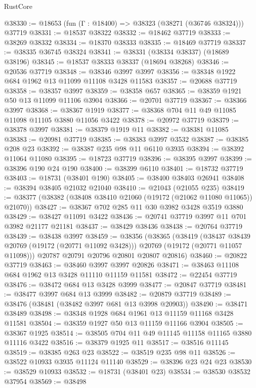 \begin{lexlean}{RustCore}
\begin{coremodule}
@38330 := @18653 (fun (Γ : @18400) => @38323 (@38271 (@36746 @38324))) @37719
@38331 := @18537 @38322
@38332 := @18462 @37719
@38333 := @38269 @38332
@38334 := @18370 @38333
@38335 := @18469 @37719
@38337 := @38335 @36745 @38324
@38341 := @38331 (@38334 @38337) (@18689 @38196)
@38345 := @18537 @38333 @38337 (@18694 @38268)
@38346 := @20536 @37719
@38348 := @38346 @3997 @3997
@38356 := @38348 @1922 @684 @1962 @13 @11099 @11108 @3428 @11583
@38357 := @20688 @37719
@38358 := @38357 @3997
@38359 := @38358 @657
@38365 := @38359 @1921 @50 @13 @11099 @11106 @3904
@38366 := @20701 @37719
@38367 := @38366 @3997
@38368 := @38367 @1919
@38377 := @38368 @704 @11 @49 @11085 @11098 @11105 @3880 @11056 @3422
@38378 := @20972 @37719
@38379 := @38378 @3997
@38381 := @38379 @1919 @11
@38382 := @38381 @11085
@38383 := @20981 @37719
@38385 := @38383 @3997 @3532
@38387 := @38385 @208 @23
@38392 := @38387 @235 @98 @11 @6110 @3935
@38394 := @38392 @11064 @11080
@38395 := @18723 @37719
@38396 := @38395 @3997
@38399 := @38396 @190 @24 @190
@38400 := @38399 @6110
@38401 := @18732 @37719
@38403 := @18731 (@38401 @190)
@38405 := @38400 @38403 @26941
@38408 := @38394 @38405 @21032 @21040
@38410 := @21043 (@21055 @235)
@38419 := @38377 (@38382 (@38408 @38410 @21060 (@19172 (@21062 @11080 @11065)) @21070))
@38427 := @38367 @702 @285 @11 @30 @3982 @3428 @3519 @3880
@38429 := @38427 @11091 @3422
@38436 := @20741 @37719 @3997 @11 @701 @3982 @21177 @21181
@38437 := @38429 @38436
@38438 := @20764 @37719
@38439 := @38438 @3997
@38459 := @38356
    (@38365
      (@38419
        (@38437 @38439 @20769 (@19172 (@20771 @11092 @3428)))
        @20769
        (@19172 (@20771 @11057 @11098)))
      @20787
      @20791
      @20796
      @20801
      @20807
      @20816)
@38460 := @20822 @37719
@38463 := @38460 @3997 @3997 @20826
@38471 := @38463 @11108 @684 @1962 @13 @3428 @11110 @11159 @11581
@38472 := @22454 @37719
@38476 := @38472 @684 @13 @3428 @3999
@38477 := @20847 @37719
@38481 := @38477 @3997 @684 @13 @3999
@38482 := @20879 @37719
@38489 := @38476 (@38481 (@38482 @3997 @681 @13 @3998 @20903))
@38490 := @38471 @38489
@38498 := @38348 @1928 @684 @1961 @13 @11159 @11168 @3428 @11581
@38504 := @38359 @1927 @50 @13 @11159 @11166 @3904
@38505 := @38367 @1925
@38514 := @38505 @704 @11 @49 @11145 @11158 @11165 @3880 @11116 @3422
@38516 := @38379 @1925 @11
@38517 := @38516 @11145
@38519 := @38385 @263 @23
@38522 := @38519 @235 @98 @11
@38526 := @38522 @10933 @3935 @11124 @11140
@38529 := @38396 @23 @24 @23
@38530 := @38529 @10933
@38532 := @18731 (@38401 @23)
@38534 := @38530 @38532 @37954
@38569 := @38498

\end{coremodule}
\end{lexlean}
